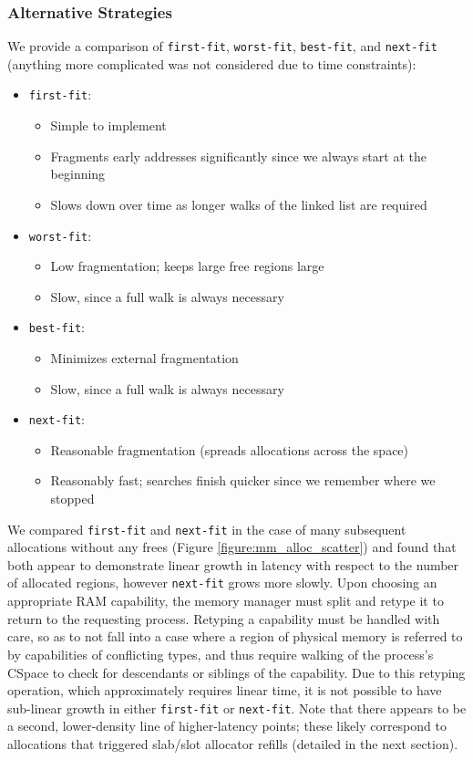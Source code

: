 \subsubsection{Alternative Strategies}
We provide a comparison of \texttt{first-fit}, \texttt{worst-fit}, \texttt{best-fit}, and \texttt{next-fit} (anything more complicated was not considered due to time constraints):
\begin{itemize}[itemsep=-5pt]
    \item \texttt{first-fit}:
    \begin{itemize}[itemsep=0pt]
        \item Simple to implement
        \item Fragments early addresses significantly since we always start at the beginning
        \item Slows down over time as longer walks of the linked list are required
    \end{itemize}
    \item \texttt{worst-fit}:
    \begin{itemize}[itemsep=0pt]
        \item Low fragmentation; keeps large free regions large
        \item Slow, since a full walk is always necessary
    \end{itemize}
    \item \texttt{best-fit}:
    \begin{itemize}[itemsep=0pt]
        \item Minimizes external fragmentation
        \item Slow, since a full walk is always necessary 
    \end{itemize}
    \item \texttt{next-fit}:
    \begin{itemize}[itemsep=0pt]
        \item Reasonable fragmentation (spreads allocations across the space)
        \item Reasonably fast; searches finish quicker since we remember where we stopped
    \end{itemize}
\end{itemize}
We compared \texttt{first-fit} and \texttt{next-fit} in the case of many subsequent allocations without any frees (Figure \ref{figure:mm_alloc_scatter}) and found that both appear to demonstrate linear growth in latency with respect to the number of allocated regions, however \texttt{next-fit} grows more slowly. Upon choosing an appropriate RAM capability, the memory manager must split and retype it to return to the requesting process. Retyping a capability must be handled with care, so as to not fall into a case where a region of physical memory is referred to by capabilities of conflicting types, and thus require walking of the process's CSpace to check for descendants or siblings of the capability. Due to this retyping operation, which approximately requires linear time, it is not possible to have sub-linear growth in either \texttt{first-fit} or \texttt{next-fit}. Note that there appears to be a second, lower-density line of higher-latency points; these likely correspond to allocations that triggered slab/slot allocator refills (detailed in the next section).
